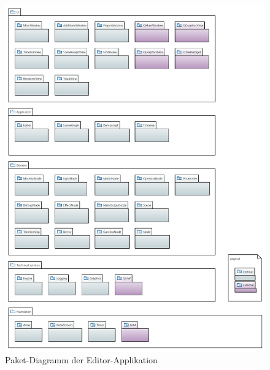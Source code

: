 \begin{figure}[H]
    \centering
    \includegraphics[width=1.0\textwidth]{img/editor_package_diagram.PNG}
    \caption{Paket-Diagramm der Editor-Applikation}\label{fig:package-diagram:editor}
\end{figure}
